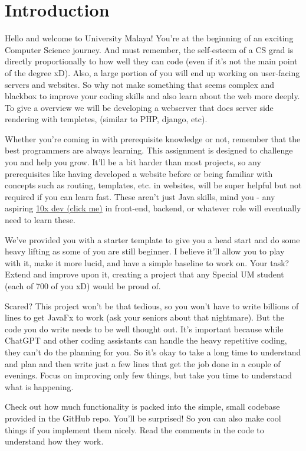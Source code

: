 \documentclass{article}
\begin{document}
\section{Introduction}

Hello and welcome to University Malaya! You're at the beginning of an exciting Computer Science journey. And must remember, the self-esteem of a CS grad is directly proportionally to how well they can code (even if it's not the main point of the degree xD). Also, a large portion of you will end up working on user-facing servers and websites. So why not make something that seems complex and blackbox to improve your coding skills and also learn about the web more deeply. To give a overview we will be developing a webserver that does server side rendering with templetes, (similar to PHP, django, etc). 

Whether you're coming in with prerequisite knowledge or not, remember that the best programmers are always learning. This assignment is designed to challenge you and help you grow. It'll be a bit harder than most projects, so any prerequisites like having developed a website before or being familiar with concepts such as routing, templates, etc. in websites, will be super helpful but not required if you can learn fast. These aren't just Java skills, mind you - any aspiring \href{https://www.simplethread.com/the-10x-programmer-myth/}{10x dev (click me)} in front-end, backend, or whatever role will eventually need to learn these. 

We've provided you with a starter template to give you a head start and do some heavy lifting as some of you are still beginner. I believe it'll allow you to play with it, make it more lucid, and have a simple baseline to work on. Your task? Extend and improve upon it, creating a project that any Special UM student (each of 700 of you xD) would be proud of. 

Scared? This project won't be that tedious, so you won't have to write billions of lines to get JavaFx to work (ask your seniors about that nightmare). But the code you do write needs to be well thought out. It's important because while ChatGPT and other coding assistants can handle the heavy repetitive coding, they can't do the planning for you. So it's okay to take a long time to understand and plan and then write just a few lines that get the job done in a couple of evenings. Focus on improving only few things, but take you time to understand what is happening. 

Check out how much functionality is packed into the simple, small codebase provided in the GitHub repo. You'll be surprised! So you can also make cool things if you implement them nicely. Read the comments in the code to understand how they work.
\end{document}
